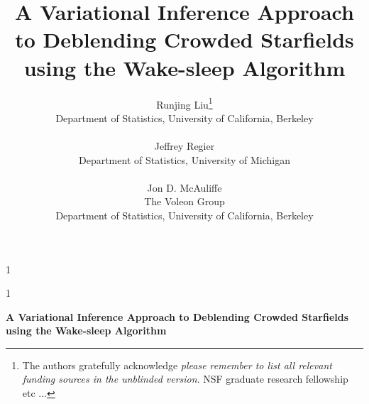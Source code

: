 \documentclass[12pt]{article}
\newcommand{\blind}{1}
\begin{document}
%

\def\spacingset#1{\renewcommand{\baselinestretch}%
{#1}\small\normalsize} \spacingset{1}


\blind
{
  \title{\bf  A Variational Inference Approach to Deblending Crowded Starfields using the Wake-sleep Algorithm}
  \author{Runjing Liu\thanks{
    The authors gratefully acknowledge \textit{please remember to list all relevant funding sources in the unblinded version}. NSF graduate research fellowship etc ... }\hspace{.2cm}\\
    Department of Statistics, University of California, Berkeley\\
    \\
    Jeffrey Regier \\
    Department of Statistics, University of Michigan\\
    \\
    Jon D. McAuliffe \\
    The Voleon Group \\
    Department of Statistics, University of California, Berkeley}
  \maketitle
} \fi

\blind
{
  \bigskip
  \bigskip
  \bigskip
  \begin{center}
    {\LARGE\bf A Variational Inference Approach to Deblending Crowded Starfields using the Wake-sleep Algorithm}
\end{center}
  \medskip
} \fi
\end{document}
